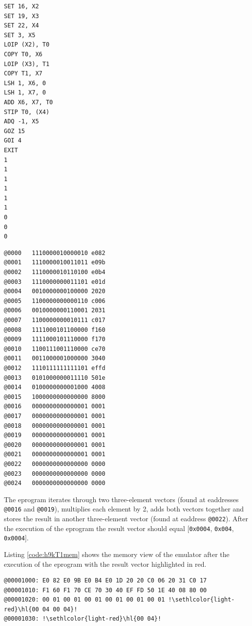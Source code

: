 \documentclass[11pt, a4paper]{article}
\begin{document}
\noindent
\begin{minipage}{.40\textwidth}
	\begin{lstlisting}[style=customasm, caption={HAL9000 assignment code}, label={code:h9kT1}]
SET 16, X2
SET 19, X3
SET 22, X4
SET 3, X5
LOIP (X2), T0
COPY T0, X6
LOIP (X3), T1
COPY T1, X7
LSH 1, X6, 0
LSH 1, X7, 0
ADD X6, X7, T0
STIP T0, (X4)
ADQ -1, X5
GOZ 15
GOI 4
EXIT
1
1
1
1
1
1
0
0
0
	\end{lstlisting}
\end{minipage}
\hfill
\begin{minipage}{.55\textwidth}
	\begin{lstlisting}[style=customasm, caption={HAL9000 assembled assignment code}, label={code:h9kT1asm}]
@0000   1110000010000010 e082
@0001   1110000010011011 e09b
@0002   1110000010110100 e0b4
@0003   1110000000011101 e01d
@0004   0010000000100000 2020
@0005   1100000000000110 c006
@0006   0010000000110001 2031
@0007   1100000000010111 c017
@0008   1111000101100000 f160
@0009   1111000101110000 f170
@0010   1100111001110000 ce70
@0011   0011000001000000 3040
@0012   1110111111111101 effd
@0013   0101000000011110 501e
@0014   0100000000001000 4008
@0015   1000000000000000 8000
@0016   0000000000000001 0001
@0017   0000000000000001 0001
@0018   0000000000000001 0001
@0019   0000000000000001 0001
@0020   0000000000000001 0001
@0021   0000000000000001 0001
@0022   0000000000000000 0000
@0023   0000000000000000 0000
@0024   0000000000000000 0000
	\end{lstlisting}
\end{minipage}

The eprogram iterates through two three-element vectors (found at eaddresses \verb|@0016| and
\verb|@0019|), multiplies each element by 2, adds both vectors together and stores the result in
another three-element vector (found at eaddress \verb|@0022|). After the execution of the eprogram
the result vector should equal [\verb|0x0004|, \verb|0x004|, \verb|0x0004|].

Listing \ref{code:h9kT1mem} shows the memory view of the emulator after the execution of the
eprogram with the result vector highlighted in red.
\begin{lstlisting}[style=customasm, caption={HAL9000 assignment code memory view},
	label={code:h9kT1mem}, escapechar=!, columns=fullflexible]
@00001000: E0 82 E0 9B E0 B4 E0 1D 20 20 C0 06 20 31 C0 17
@00001010: F1 60 F1 70 CE 70 30 40 EF FD 50 1E 40 08 80 00
@00001020: 00 01 00 01 00 01 00 01 00 01 00 01 !\sethlcolor{light-red}\hl{00 04 00 04}!
@00001030: !\sethlcolor{light-red}\hl{00 04}!
\end{lstlisting}
\end{document}
